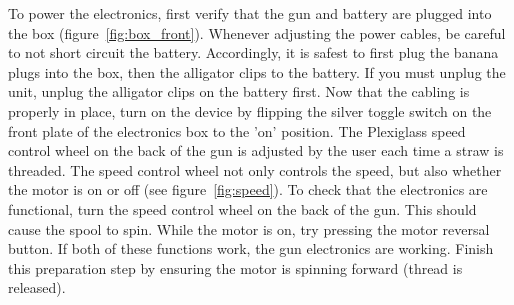\documentclass[letterpaper,12pt]{article}
\begin{document}
To power the electronics, first verify that the gun and battery are plugged into the box (figure~\ref{fig:box_front}). Whenever adjusting the power cables, be careful to not short circuit the battery. Accordingly, it is safest to first plug the banana plugs into the box, then the alligator clips to the battery. If you must unplug the unit, unplug the alligator clips on the battery first. Now that the cabling is properly in place, turn on the device by flipping the silver toggle switch on the front plate of the electronics box to the 'on' position. The Plexiglass speed control wheel on the back of the gun is adjusted by the user each time a straw is threaded. The speed control wheel not only controls the speed, but also whether the motor is on or off (see figure~\ref{fig:speed}). To check that the electronics are functional, turn the speed control wheel on the back of the gun. This should cause the spool to spin. While the motor is on, try pressing the motor reversal button. If both of these functions work, the gun electronics are working. Finish this preparation step by ensuring the motor is spinning forward (thread is released). \par
\end{document}
